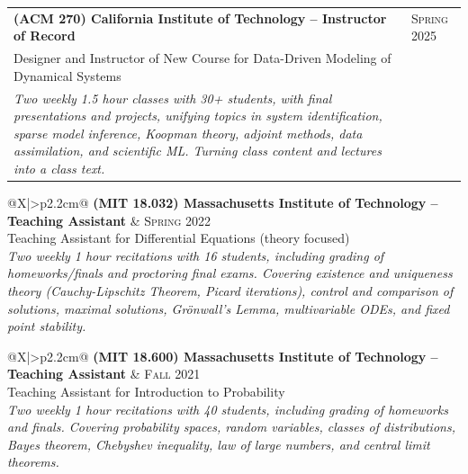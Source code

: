 \documentclass[a4paper,10pt]{article}
\newcommand{\faPaperclip}{{\ResumeLinkFont\symbol{"F0C6}}}
\begin{document}
\begin{tabularx}{\textwidth}{@{}X|>{\raggedleft\arraybackslash}p{2.2cm}@{}}
\textbf{(ACM 270) California Institute of Technology -- Instructor of Record} \href{\detokenize{https://schedules.caltech.edu/syllabi/ACM270_SP2425.pdf}}{\faPaperclip} & \textsc{Spring} 2025\\[2pt]
Designer and Instructor of New Course for Data-Driven Modeling of Dynamical Systems\\
\textit{Two weekly 1.5 hour classes with 30+ students, with final presentations and projects, unifying topics in system identification, sparse model inference, Koopman theory, adjoint methods, data assimilation, and scientific ML. Turning class content and lectures into a class text.}
\end{tabularx}
\vspace{10pt}

\begin{tabularx}{\textwidth}{@{}X|>{\raggedleft\arraybackslash}p{2.2cm}@{}}
\textbf{(MIT 18.032) Massachusetts Institute of Technology -- Teaching Assistant} \href{\detokenize{http://student.mit.edu/catalog/search.cgi?search=18.032&style=verbatim}}{\faPaperclip} & \textsc{Spring} 2022\\[2pt]
Teaching Assistant for Differential Equations (theory focused)\\
\textit{Two weekly 1 hour recitations with 16 students, including grading of homeworks/finals and proctoring final exams. Covering existence and uniqueness theory (Cauchy-Lipschitz Theorem, Picard iterations), control and comparison of solutions, maximal solutions, Grönwall's Lemma, multivariable ODEs, and fixed point stability.}
\end{tabularx}
\vspace{10pt}

\begin{tabularx}{\textwidth}{@{}X|>{\raggedleft\arraybackslash}p{2.2cm}@{}}
\textbf{(MIT 18.600) Massachusetts Institute of Technology -- Teaching Assistant} \href{\detokenize{http://student.mit.edu/catalog/search.cgi?search=18.600&style=verbatim}}{\faPaperclip} & \textsc{Fall} 2021\\[2pt]
Teaching Assistant for Introduction to Probability\\
\textit{Two weekly 1 hour recitations with 40 students, including grading of homeworks and finals. Covering probability spaces, random variables, classes of distributions, Bayes theorem, Chebyshev inequality, law of large numbers, and central limit theorems.}
\end{tabularx}
\vspace{10pt}
\end{document}

